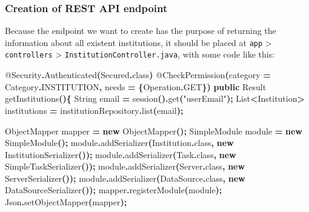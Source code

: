 \documentclass[
  11pt,
]{krantz}
\newenvironment{Shaded}{\begin{snugshade}}{\end{snugshade}}
\newcommand{\AttributeTok}[1]{\textcolor[rgb]{0.61,0.61,0.61}{#1}}
\newcommand{\BuiltInTok}[1]{#1}
\newcommand{\FunctionTok}[1]{\textcolor[rgb]{0,0,0}{#1}}
\newcommand{\KeywordTok}[1]{\textcolor[rgb]{0.27,0.27,0.27}{\textbf{#1}}}
\newcommand{\NormalTok}[1]{#1}
\newcommand{\OperatorTok}[1]{\textcolor[rgb]{0.43,0.43,0.43}{\textbf{#1}}}
\newcommand{\StringTok}[1]{\textcolor[rgb]{0.5,0.5,0.5}{#1}}
\begin{document}
\hypertarget{creation-of-rest-api-endpoint}{%
\subsubsection{Creation of REST API endpoint}\label{creation-of-rest-api-endpoint}}

Because the endpoint we want to create has the purpose of returning the information about all existent institutions, it should be placed at \texttt{app} \textgreater{} \texttt{controllers} \textgreater{} \texttt{InstitutionController.java}, with some code like this:

\begin{Shaded}
\begin{Highlighting}[]
\AttributeTok{@Security}\OperatorTok{.}\FunctionTok{Authenticated}\OperatorTok{(}\NormalTok{Secured}\OperatorTok{.}\FunctionTok{class}\OperatorTok{)}
\AttributeTok{@CheckPermission}\OperatorTok{(}\NormalTok{category }\OperatorTok{=}\NormalTok{ Category}\OperatorTok{.}\FunctionTok{INSTITUTION}\OperatorTok{,}\NormalTok{ needs }\OperatorTok{=} \OperatorTok{\{}\BuiltInTok{Operation}\OperatorTok{.}\FunctionTok{GET}\OperatorTok{\})}
\KeywordTok{public} \BuiltInTok{Result} \FunctionTok{getInstitutions}\OperatorTok{()\{}
    \BuiltInTok{String}\NormalTok{ email }\OperatorTok{=} \FunctionTok{session}\OperatorTok{().}\FunctionTok{get}\OperatorTok{(}\StringTok{"userEmail"}\OperatorTok{);}
    \BuiltInTok{List}\OperatorTok{\textless{}}\NormalTok{Institution}\OperatorTok{\textgreater{}}\NormalTok{ institutions }\OperatorTok{=}\NormalTok{ institutionRepository}\OperatorTok{.}\FunctionTok{list}\OperatorTok{(}\NormalTok{email}\OperatorTok{);}

\NormalTok{    ObjectMapper mapper }\OperatorTok{=} \KeywordTok{new} \FunctionTok{ObjectMapper}\OperatorTok{();}
\NormalTok{    SimpleModule module }\OperatorTok{=} \KeywordTok{new} \FunctionTok{SimpleModule}\OperatorTok{();}
\NormalTok{    module}\OperatorTok{.}\FunctionTok{addSerializer}\OperatorTok{(}\NormalTok{Institution}\OperatorTok{.}\FunctionTok{class}\OperatorTok{,} \KeywordTok{new} \FunctionTok{InstitutionSerializer}\OperatorTok{());}
\NormalTok{    module}\OperatorTok{.}\FunctionTok{addSerializer}\OperatorTok{(}\NormalTok{Task}\OperatorTok{.}\FunctionTok{class}\OperatorTok{,} \KeywordTok{new} \FunctionTok{SimpleTaskSerializer}\OperatorTok{());}
\NormalTok{    module}\OperatorTok{.}\FunctionTok{addSerializer}\OperatorTok{(}\NormalTok{Server}\OperatorTok{.}\FunctionTok{class}\OperatorTok{,} \KeywordTok{new} \FunctionTok{ServerSerializer}\OperatorTok{());}
\NormalTok{    module}\OperatorTok{.}\FunctionTok{addSerializer}\OperatorTok{(}\BuiltInTok{DataSource}\OperatorTok{.}\FunctionTok{class}\OperatorTok{,} \KeywordTok{new} \FunctionTok{DataSourceSerializer}\OperatorTok{());}
\NormalTok{    mapper}\OperatorTok{.}\FunctionTok{registerModule}\OperatorTok{(}\NormalTok{module}\OperatorTok{);}
\NormalTok{    Json}\OperatorTok{.}\FunctionTok{setObjectMapper}\OperatorTok{(}\NormalTok{mapper}\OperatorTok{);}


\end{Highlighting}
\end{Shaded}
\end{document}
